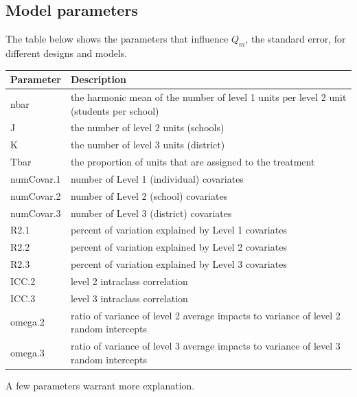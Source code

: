 \documentclass[
]{article}
\begin{document}
\subsection{Model parameters}
\label{sec:params}

The table below shows the parameters that influence \(Q_m\), the
standard error, for different designs and models.

\begin{tabular}{l|l}
\hline
Parameter & Description\\
\hline
nbar & the harmonic mean of the number of level 1 units per level 2 unit (students per school)\\
\hline
J & the number of level 2 units (schools)\\
\hline
K & the number of level 3 units (district)\\
\hline
Tbar & the proportion of units that are assigned to the treatment\\
\hline
numCovar.1 & number of Level 1 (individual) covariates\\
\hline
numCovar.2 & number of Level 2 (school) covariates\\
\hline
numCovar.3 & number of Level 3 (district) covariates\\
\hline
R2.1 & percent of variation explained by Level 1 covariates\\
\hline
R2.2 & percent of variation explained by Level 2 covariates\\
\hline
R2.3 & percent of variation explained by Level 3 covariates\\
\hline
ICC.2 & level 2 intraclass correlation\\
\hline
ICC.3 & level 3 intraclass correlation\\
\hline
omega.2 & ratio of variance of level 2 average impacts to variance of level 2 random intercepts\\
\hline
omega.3 & ratio of variance of level 3 average impacts to variance of level 3 random intercepts\\
\hline
\end{tabular}

A few parameters warrant more explanation.
\end{document}
